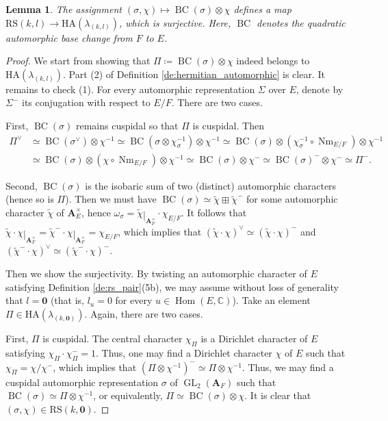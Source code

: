 \documentclass[12pt]{amsart}
\numberwithin{equation}{section}
\theoremstyle{plain}
\newtheorem{lem}[proposition]{Lemma}
\theoremstyle{definition}
\theoremstyle{remark}
\renewcommand{\b}[1]{\mathbf{#1}}
\renewcommand{\d}[1]{\mathbb{#1}}
\renewcommand{\r}[1]{\mathrm{#1}}
\renewcommand{\(}{\left(}
\renewcommand{\)}{\right)}
\newcommand{\res}{\mathbin{|}}
\newcommand{\bA}{\b A}
\newcommand{\dC}{\d C}
\newcommand{\RS}{\r{RS}}
\newcommand{\HA}{\r{HA}}
\DeclareMathOperator{\BC}{BC}
\DeclareMathOperator{\GL}{GL}
\DeclareMathOperator{\Hom}{Hom}
\DeclareMathOperator{\Nm}{Nm}
\begin{document}
\begin{lem}\label{le:base_change}
The assignment $(\sigma,\chi)\mapsto \BC(\sigma)\otimes\chi$ defines a map $\RS(k,l)\to\HA(\lambda_{(k,l)})$, which is surjective. Here, $\BC$ denotes the quadratic automorphic base change from $F$ to $E$.
\end{lem}

\begin{proof}
We start from showing that $\Pi\coloneqq\BC(\sigma)\otimes\chi$ indeed belongs to $\HA(\lambda_{(k,l)})$. Part (2) of Definition \ref{de:hermitian_automorphic} is clear. It remains to check (1). For every automorphic representation $\Sigma$ over $E$, denote by $\Sigma^-$ its conjugation with respect to $E/F$. There are two cases.

First, $\BC(\sigma)$ remains cuspidal so that $\Pi$ is cuspidal. Then
\begin{align*}
\Pi^\vee&\simeq\BC(\sigma^\vee)\otimes\chi^{-1}\simeq\BC(\sigma\otimes\chi_\sigma^{-1})\otimes\chi^{-1}
\simeq\BC(\sigma)\otimes(\chi_\sigma^{-1}\circ\Nm_{E/F})\otimes\chi^{-1} \\
&\simeq\BC(\sigma)\otimes(\chi\circ\Nm_{E/F})\otimes\chi^{-1}
\simeq\BC(\sigma)\otimes\chi^-
\simeq\BC(\sigma)^-\otimes\chi^-\simeq\Pi^-.
\end{align*}

Second, $\BC(\sigma)$ is the isobaric sum of two (distinct) automorphic characters (hence so is $\Pi$). Then we must have $\BC(\sigma)\simeq\tilde\chi\boxplus\tilde\chi^-$ for some automorphic character $\tilde\chi$ of $\bA_E^\times$, hence $\omega_\sigma=\tilde\chi\res_{\bA_F^\times}\cdot\chi_{E/F}$. It follows that $\tilde\chi\cdot\chi\res_{\bA_F^\times}=\tilde\chi^-\cdot\chi\res_{\bA_F^\times}=\chi_{E/F}$, which implies that $(\tilde\chi\cdot\chi)^\vee\simeq(\tilde\chi\cdot\chi)^-$ and $(\tilde\chi^-\cdot\chi)^\vee\simeq(\tilde\chi^-\cdot\chi)^-$.

Then we show the surjectivity. By twisting an automorphic character of $E$ satisfying Definition \ref{de:rs_pair}(5b), we may assume without loss of generality that $l=\b{0}$ (that is, $l_u=0$ for every $u\in\Hom(E,\dC)$). Take an element $\Pi\in\HA(\lambda_{(k,\b{0})})$. Again, there are two cases.

First, $\Pi$ is cuspidal. The central character $\chi_\Pi$ is a Dirichlet character of $E$ satisfying $\chi_\Pi\cdot\chi_\Pi^-=1$. Thus, one may find a Dirichlet character $\chi$ of $E$ such that $\chi_\Pi=\chi/\chi^-$, which implies that $(\Pi\otimes\chi^{-1})^-\simeq\Pi\otimes\chi^{-1}$. Thus, we may find a cuspidal automorphic representation $\sigma$ of $\GL_2(\bA_F)$ such that $\BC(\sigma)\simeq\Pi\otimes\chi^{-1}$, or equivalently, $\Pi\simeq\BC(\sigma)\otimes\chi$. It is clear that $(\sigma,\chi)\in\RS(k,\b{0})$.


\end{proof}
\end{document}
